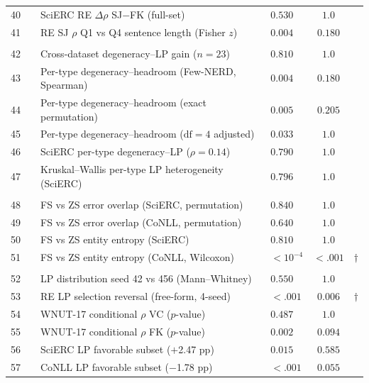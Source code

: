 \begin{table}[t]
\begin{tabular}{clllcc}
40 & & SciERC RE $\Delta\rho$ SJ$-$FK (full-set) & $0.530$ & $1.0$ &  \\
41 & & RE SJ $\rho$ Q1 vs Q4 sentence length (Fisher $z$) & $0.004$ & $0.180$ &  \\
\addlinespace
\multicolumn{6}{l}{\textit{Correlation}} \\
42 & & Cross-dataset degeneracy--LP gain ($n{=}23$) & $0.810$ & $1.0$ &  \\
43 & & Per-type degeneracy--headroom (Few-NERD, Spearman) & $0.004$ & $0.180$ &  \\
44 & & Per-type degeneracy--headroom (exact permutation) & $0.005$ & $0.205$ &  \\
45 & & Per-type degeneracy--headroom ($\text{df}{=}4$ adjusted) & $0.033$ & $1.0$ &  \\
46 & & SciERC per-type degeneracy--LP ($\rho{=}0.14$) & $0.790$ & $1.0$ &  \\
47 & & Kruskal--Wallis per-type LP heterogeneity (SciERC) & $0.796$ & $1.0$ &  \\
\addlinespace
\multicolumn{6}{l}{\textit{FS error}} \\
48 & & FS vs ZS error overlap (SciERC, permutation) & $0.840$ & $1.0$ &  \\
49 & & FS vs ZS error overlap (CoNLL, permutation) & $0.640$ & $1.0$ &  \\
50 & & FS vs ZS entity entropy (SciERC) & $0.810$ & $1.0$ &  \\
51 & & FS vs ZS entity entropy (CoNLL, Wilcoxon) & ${<}10^{-4}$ & ${<}.001$ & $\dagger$ \\
\addlinespace
\multicolumn{6}{l}{\textit{Other}} \\
52 & & LP distribution seed 42 vs 456 (Mann--Whitney) & $0.550$ & $1.0$ &  \\
53 & & RE LP selection reversal (free-form, 4-seed) & ${<}.001$ & $0.006$ & $\dagger$ \\
54 & & WNUT-17 conditional $\rho$ VC ($p$-value) & $0.487$ & $1.0$ &  \\
55 & & WNUT-17 conditional $\rho$ FK ($p$-value) & $0.002$ & $0.094$ &  \\
56 & & SciERC LP favorable subset ($+$2.47 pp) & $0.015$ & $0.585$ &  \\
57 & & CoNLL LP favorable subset ($-$1.78 pp) & ${<}.001$ & $0.055$ &  \\
\bottomrule
\end{tabular}
\end{table}
